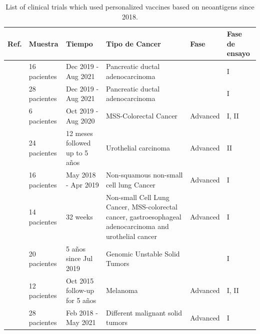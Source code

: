 \begin{table}[h]
	\caption{List of clinical trials which used personalized vaccines based on neoantigens since 2018.}
	\label{tab:review_clinics}
	\centering
	\setlength{\tabcolsep}{0.5em} %
	{\renewcommand{\arraystretch}{1.5}%
		{\scriptsize
			\begin{tabular}{p{2cm}p{1.8cm}p{2cm}p{4.5cm}p{1.5cm}p{1cm}}
				\textbf{Ref.} & \textbf{Muestra} & \textbf{Tiempo} & \textbf{Tipo de Cancer} & \textbf{Fase} & \textbf{Fase de ensayo} \\ \hline
				
				\cite{personalizedVaccinemRNA2023} & 16 pacientes & Dec 2019 - Aug 2021 & Pancreatic ductal adenocarcinoma & & I \\ 
				
				
				
				\cite{rojas2023personalized} & 28 pacientes & Dec 2019 - Aug 2021 & Pancreatic ductal adenocarcinoma & & I \\
				
				\cite{yu2023preliminary} & 6 pacientes & Oct 2019 - Aug 2020 & MSS-Colorectal Cancer & Advanced & I, II \\
				
				\cite{holm2022neoantigen} & 24 pacientes & 12 meses followed up to 5 años  & Urothelial carcinoma & Advanced & II \\
				
				\cite{awad2022personalized} & 16 pacientes &  May 2018 - Apr 2019 & Non-squamous non-small cell lung Cancer & Advanced & I \\
				
				\cite{palmer2022individualized} & 14 pacientes & 32 weeks & Non-small Cell Lung Cancer, MSS-colorectal cancer, gastroesophageal adenocarcinoma and urothelial cancer & Advanced & I \\
				
				\cite{wang2022therapy} & 20 pacientes & 5 años since Jul 2019 & Genomic Unstable Solid Tumors & & I \\
				
				\cite{ellingsen2022characterization} & 12 pacientes & Oct 2015 follow-up for 5 años & Melanoma & Advanced & I, II \\
				
				\cite{shou2022combination} & 28 pacientes & Feb 2018 - May  2021 & Different malignant solid tumors & Advanced & I \\
				

\end{tabular}}}
\end{table}
